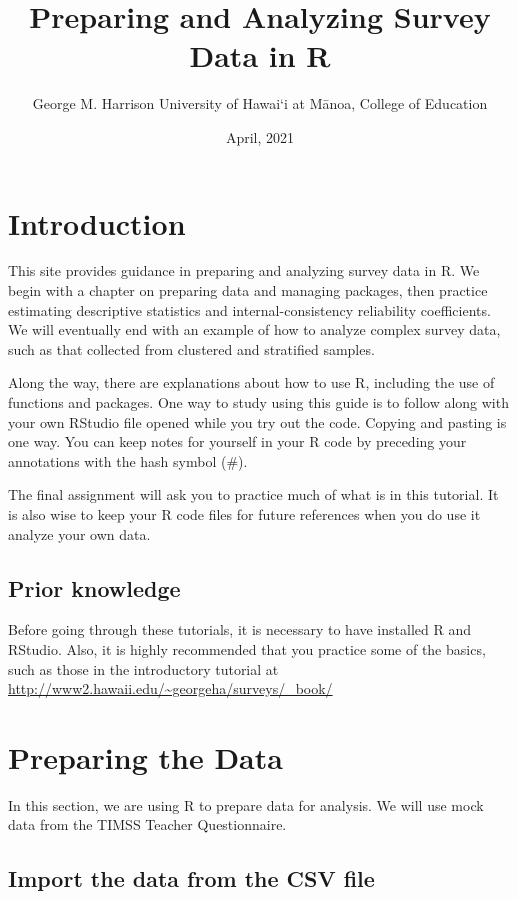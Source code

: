 \documentclass[
]{article}
\title{Preparing and Analyzing Survey Data in R}
\author{George M. Harrison University of Hawai`i at Mānoa, College of Education}
\date{April, 2021}
\begin{document}
\maketitle

{
\setcounter{tocdepth}{2}
\tableofcontents
}
\hypertarget{introduction}{%
\section{Introduction}\label{introduction}}

This site provides guidance in preparing and analyzing survey data in R. We begin with a chapter on preparing data and managing packages, then practice estimating descriptive statistics and internal-consistency reliability coefficients. We will eventually end with an example of how to analyze complex survey data, such as that collected from clustered and stratified samples.

Along the way, there are explanations about how to use R, including the use of functions and packages. One way to study using this guide is to follow along with your own RStudio file opened while you try out the code. Copying and pasting is one way. You can keep notes for yourself in your R code by preceding your annotations with the hash symbol (\#).

The final assignment will ask you to practice much of what is in this tutorial. It is also wise to keep your R code files for future references when you do use it analyze your own data.

\hypertarget{prior-knowledge}{%
\subsection{Prior knowledge}\label{prior-knowledge}}

Before going through these tutorials, it is necessary to have installed R and RStudio. Also, it is highly recommended that you practice some of the basics, such as those in the introductory tutorial at \url{http://www2.hawaii.edu/~georgeha/surveys/_book/}

\hypertarget{Prepping}{%
\section{Preparing the Data}\label{Prepping}}

In this section, we are using R to prepare data for analysis. We will use mock data from the TIMSS Teacher Questionnaire.

\hypertarget{import-the-data-from-the-csv-file}{%
\subsection{Import the data from the CSV file}\label{import-the-data-from-the-csv-file}}
\end{document}
